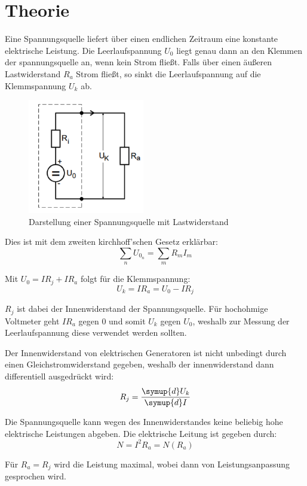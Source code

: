 \section{Theorie}
\label{sec:Theorie}
Eine Spannungsquelle liefert über einen endlichen Zeitraum eine konstante elektrische Leistung.
Die Leerlaufspannung $U_0$ liegt genau dann an den Klemmen der spannungsquelle an, wenn kein Strom fließt.
Falls über einen äußeren Lastwiderstand $R_a$ Strom fließt, so sinkt die Leerlaufspannung auf
die Klemmspannung $U_k$ ab.

\begin{figure}[H]
  \centering
  \includegraphics[height=5cm]{bild1.PNG}
  \caption{Darstellung einer Spannungsquelle mit Lastwiderstand}
  \label{fig:RLC-Kreis(mit Widerstand)}
\end{figure}


Dies ist mit dem zweiten kirchhoff'schen Gesetz erklärbar:
\begin{equation}
  \sum_{n} U_{0_n} = \sum_{m} R_m I_m
\end{equation}

Mit $U_0 = IR_j + IR_a$ folgt für die Klemmspannung:
\begin{equation}
  U_k = IR_a = U_0 - IR_j
\end{equation}

$R_j$ ist dabei der Innenwiderstand der Spannungsquelle.
Für hochohmige Voltmeter geht $IR_a$ gegen $0$ und somit $U_k$ gegen $U_0$, weshalb zur Messung der Leerlaufspannung
diese verwendet werden sollten.

Der Innenwiderstand von elektrischen Generatoren ist nicht unbedingt durch einen Gleichstromwiderstand gegeben, weshalb
der innenwiderstand dann differentiell ausgedrückt wird:
\begin{equation}
  R_j = \frac{\symup{d}U_k}{\symup{d}I}
\end{equation}

Die Spannungsquelle kann wegen des Innenwiderstandes keine beliebig hohe elektrische Leistungen
abgeben. Die elektrische Leitung ist gegeben durch:
\begin{equation}
  N = I^2 R_a = N(R_a)
\end{equation}

Für $R_a = R_j$ wird die Leistung maximal, wobei dann von Leistungsanpassung gesprochen wird.
